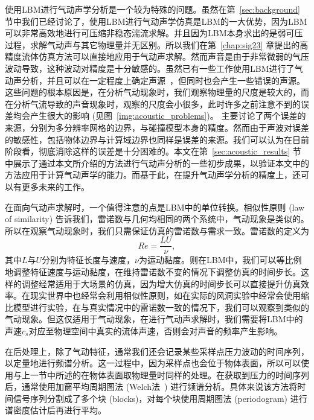 使用LBM进行气动声学分析是一个较为特殊的问题。虽然在第~\ref{sec:background} 节中我们已经讨论了，使用LBM进行气动声学仿真是LBM的一大优势，因为LBM可以非常高效地进行可压缩非稳态湍流求解。并且因为LBM本身求出的是弱可压过程，求解气动声与其它物理量并无区别。所以我们在第~\ref{chap:sig23} 章提出的高精度流体仿真方法可以直接地应用于气动声求解。然而声音是由于非常微弱的气压波动导致，这种波动对精度是十分敏感的。虽然已有一些工作使用LBM进行了气动声分析，并且可以在一定程度上确定声源~\cite{doi:10.2514/6.2013-2256, doi:10.2514/1.J052365, doi:10.2514/6.2015-2993}，但同时也会产生一些错误的声源。这些问题的根本原因是，在分析气动现象时，我们观察物理量的尺度是较大的，而在分析气流导致的声音现象时，观察的尺度会小很多，此时许多之前注意不到的误差均会产生很大的影响 (见图~\ref{img:acoustic_problems})。\citet{ASTOUL2020109645} 主要讨论了两个误差的来源，分别为多分辨率网格的边界，与碰撞模型本身的精度。然而由于声波对误差的敏感性，包括物体边界与计算域边界也同样是误差的来源。我们可以认为在目前阶段看，彻底消除这样的误差是十分困难的。本文在第~\ref{sec:acoustic_results} 节中展示了通过本文所介绍的方法进行气动声分析的一些初步成果，以验证本文中的方法应用于计算气动声学的能力。而基于此，在提升气动声学分析的精度上，还可以有更多未来的工作。

在面向气动声求解时，一个值得注意的点是LBM中的单位转换。相似性原则 (law of similarity) 告诉我们，雷诺数与几何均相同的两个系统中，气动现象是类似的。所以在观察气动现象时，我们只需保证仿真的雷诺数与需求一致。雷诺数的定义为
\begin{equation}
  Re=\frac{LU}{\nu},
\end{equation}
其中$L$与$U$分别为特征长度与速度，$\nu$为运动黏度。则在LBM中，我们可以等比例地调整特征速度与运动黏度，在维持雷诺数不变的情况下调整仿真的时间步长。这样的调整经常适用于大场景的仿真，因为增大仿真的时间步长可以直接提升仿真效率。在现实世界中也经常会利用相似性原则，如在实际的风洞实验中经常会使用缩比模型进行实验，在与真实情况中的雷诺数一致的情况下，我们可以观察到类似的气动现象。但这仅适用于气动现象，在进行气动声求解时，我们需要将LBM中的声速$c_s$对应至物理空间中真实的流体声速，否则会对声音的频率产生影响。

在后处理上，除了气动特征，通常我们还会记录某些采样点压力波动的时间序列，以定量地进行频谱分析。这一过程中，因为采样点也会位于物体表面，所以可以使用与上一节中所述的在物体表面取物理量时同样的处理。在获取到压力的时间序列后，通常使用加窗平均周期图法 (Welch法~\citep{1161901}) 进行频谱分析。具体来说该方法将时间信号序列分割成了多个块 (blocks)，对每个块使用周期图法 (periodogram) 进行谱密度估计后再进行平均。

